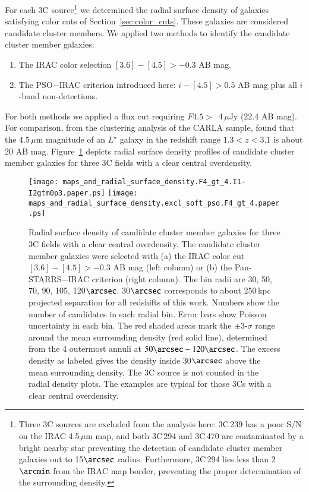 \documentclass[mathleft,fleqn,%
]{an}
\begin{document}
For each 3C source\footnote{Three 3C sources are
excluded from the analysis here:
3C\,239 has a poor S/N on the IRAC 4.5\,$\mu$m map, 
and both 3C\,294 and 3C\,470 are contaminated by a bright
nearby star preventing the detection of candidate cluster member 
galaxies out to 15$\arcsec$ radius. 
Furthermore, 3C\,294 lies less than 2$\arcmin$ from the IRAC map border,
preventing the proper determination of the surrounding density.
} 
we determined the radial surface density of galaxies satisfying 
color cuts of Section~\ref{sec:color_cuts}. 
These galaxies are considered candidate
cluster members. 
We applied two methods to identify the candidate cluster member 
galaxies:
\begin{enumerate}
\item The IRAC color selection %
$[3.6] - [4.5] > -0.3$ AB mag. 

\item The PSO$-$IRAC criterion introduced here:
   $i - [4.5] > 0.5$ AB mag plus all $i$-band
   non-detections.

\end{enumerate}
For both methods we applied a flux cut
requiring $F4.5 >$~4\,$\mu$Jy (22.4 AB mag).
For comparison, from the clustering analysis of the CARLA sample, 
\citet{Wylezalek14} found that 
the 4.5\,$\mu$m magnitude of an $L^{\star}$ galaxy in the redshift
range
$1.3 < z < 3.1$ is about 20 AB mag.
Figure~\ref{fig_single_radial_densities} depicts radial surface
density profiles 
of
candidate cluster member galaxies for three 3C fields with a clear
central overdensity. 


\begin{figure}
  \texttt{[image: maps\_and\_radial\_surface\_density.F4\_gt\_4.I1-I2gtm0p3.paper.ps]}
  \texttt{[image: maps\_and\_radial\_surface\_density.excl\_soft\_pso.F4\_gt\_4.paper.ps]}
  \caption{Radial surface density of
    candidate cluster member galaxies for three 3C fields with a clear central overdensity.
    The candidate cluster member galaxies were selected with 
    (a) the IRAC color
    cut $[3.6] - [4.5] > -0.3$ AB mag 
    (left column) or (b) the Pan-STARRS$-$IRAC criterion (right column). 
    The bin radii are 30, 50, 70, 90, 105, 120$\arcsec$.
    30$\arcsec$ corresponds to about 250\,kpc projected separation 
    for all redshifts of this work. 
    Numbers show
    the number of candidates in each radial bin. 
    Error bars show Poisson
    uncertainty in each bin. 
    The red shaded areas mark the $\pm$3-$\sigma$ 
    range around the mean
    surrounding density (red solid line),
    determined from the 4 outermost annuli at $50\arcsec - 120\arcsec$. 
    The excess density as labeled 
    gives the density  inside 30$\arcsec$
    above the mean surrounding density.
    The 3C source
    is not counted in the radial density plots.
    The examples are typical for those 3Cs with a clear central overdensity.
  }
  \label{fig_single_radial_densities}
\end{figure}
\end{document}
